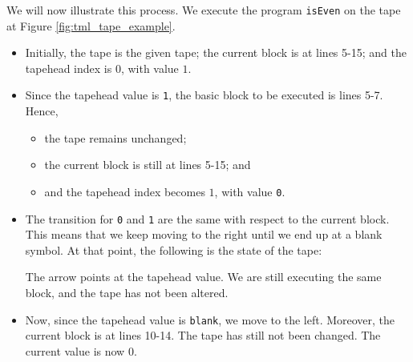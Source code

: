 \documentclass{article}
\theoremstyle{definition}
\begin{document}
    We will now illustrate this process. We execute the program \texttt{isEven} on the tape at Figure \ref{fig:tml_tape_example}.
    \begin{itemize}
        \item Initially, the tape is the given tape; the current block is at lines 5-15; and the tapehead index is $0$, with value $1$.
        
        \item Since the tapehead value is \texttt{1}, the basic block to be executed is lines 5-7. Hence,
        \begin{itemize}
            \item the tape remains unchanged;
            \item the current block is still at lines 5-15; and
            \item and the tapehead index becomes $1$, with value \texttt{0}.
        \end{itemize}
        
        \item The transition for \texttt{0} and \texttt{1} are the same with respect to the current block. This means that we keep moving to the right until we end up at a blank symbol. At that point, the following is the state of the tape:
        \begin{figure}[H]
            \centering
        \end{figure}
        The arrow points at the tapehead value. We are still executing the same block, and the tape has not been altered.
        
        \item Now, since the tapehead value is \texttt{blank}, we move to the left. Moreover, the current block is at lines 10-14. The tape has still not been changed. The current value is now $0$.
    

\end{itemize}
\end{document}
